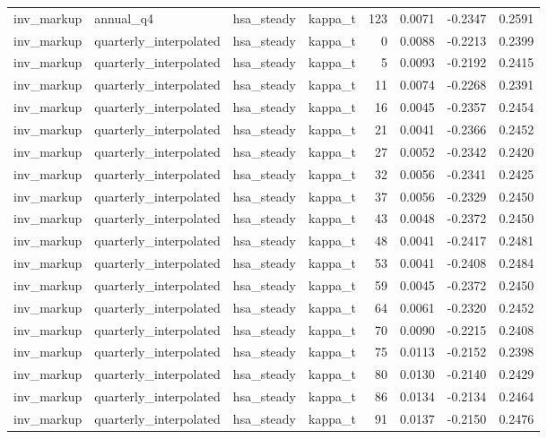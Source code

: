 \begin{tabular}{llllrrrr}
inv\_markup & annual\_q4 & hsa\_steady & kappa\_t & 123 & 0.0071 & -0.2347 & 0.2591 \\
inv\_markup & quarterly\_interpolated & hsa\_steady & kappa\_t & 0 & 0.0088 & -0.2213 & 0.2399 \\
inv\_markup & quarterly\_interpolated & hsa\_steady & kappa\_t & 5 & 0.0093 & -0.2192 & 0.2415 \\
inv\_markup & quarterly\_interpolated & hsa\_steady & kappa\_t & 11 & 0.0074 & -0.2268 & 0.2391 \\
inv\_markup & quarterly\_interpolated & hsa\_steady & kappa\_t & 16 & 0.0045 & -0.2357 & 0.2454 \\
inv\_markup & quarterly\_interpolated & hsa\_steady & kappa\_t & 21 & 0.0041 & -0.2366 & 0.2452 \\
inv\_markup & quarterly\_interpolated & hsa\_steady & kappa\_t & 27 & 0.0052 & -0.2342 & 0.2420 \\
inv\_markup & quarterly\_interpolated & hsa\_steady & kappa\_t & 32 & 0.0056 & -0.2341 & 0.2425 \\
inv\_markup & quarterly\_interpolated & hsa\_steady & kappa\_t & 37 & 0.0056 & -0.2329 & 0.2450 \\
inv\_markup & quarterly\_interpolated & hsa\_steady & kappa\_t & 43 & 0.0048 & -0.2372 & 0.2450 \\
inv\_markup & quarterly\_interpolated & hsa\_steady & kappa\_t & 48 & 0.0041 & -0.2417 & 0.2481 \\
inv\_markup & quarterly\_interpolated & hsa\_steady & kappa\_t & 53 & 0.0041 & -0.2408 & 0.2484 \\
inv\_markup & quarterly\_interpolated & hsa\_steady & kappa\_t & 59 & 0.0045 & -0.2372 & 0.2450 \\
inv\_markup & quarterly\_interpolated & hsa\_steady & kappa\_t & 64 & 0.0061 & -0.2320 & 0.2452 \\
inv\_markup & quarterly\_interpolated & hsa\_steady & kappa\_t & 70 & 0.0090 & -0.2215 & 0.2408 \\
inv\_markup & quarterly\_interpolated & hsa\_steady & kappa\_t & 75 & 0.0113 & -0.2152 & 0.2398 \\
inv\_markup & quarterly\_interpolated & hsa\_steady & kappa\_t & 80 & 0.0130 & -0.2140 & 0.2429 \\
inv\_markup & quarterly\_interpolated & hsa\_steady & kappa\_t & 86 & 0.0134 & -0.2134 & 0.2464 \\
inv\_markup & quarterly\_interpolated & hsa\_steady & kappa\_t & 91 & 0.0137 & -0.2150 & 0.2476 \\

\end{tabular}
